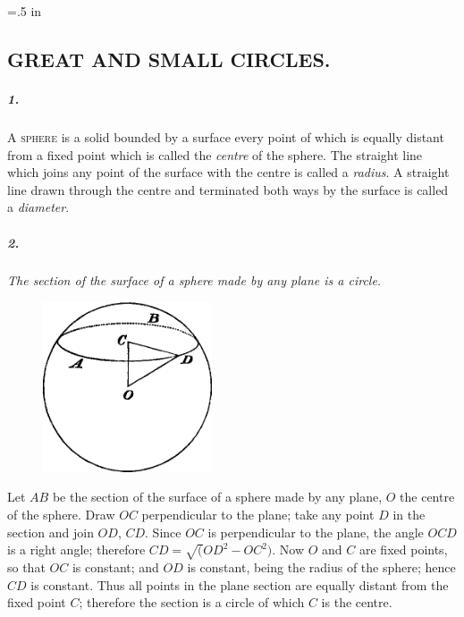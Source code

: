 \documentclass{book}[2004/02/16]
\begin{document}
\begin{mainmatter}
\headsep =.5 in
\begin{spacing}{1.3}

\chapter[Great and Small Circles.]{GREAT AND SMALL CIRCLES.}

\paragraph{1.} \textsc{A sphere} is a solid bounded by a surface every point of
which is equally distant from a fixed point which is called the
\textit{centre} of the sphere. The straight line which joins any point of
the surface with the centre is called a \textit{radius}. A straight line
drawn through the centre and terminated both ways by the surface
is called a \textit{diameter}.

\paragraph{2.} \textit{The section of the surface of a sphere made by any plane
is a circle.}
\begin{figure}[htp]
\centering
\includegraphics[width=5cm]{images/011fc}
\end{figure}

Let $AB$ be the section of the surface of a sphere made by any
plane, $O$ the centre of the sphere. Draw $OC$ perpendicular to the
plane; take any point $D$ in the section and join $OD$, $CD$. Since
$OC$ is perpendicular to the plane, the angle $OCD$ is a right angle;
therefore $CD=\surd(OD^2-OC^2)$. Now $O$ and $C$ are fixed points, so
that $OC$ is constant; and $OD$ is constant, being the radius of the
sphere; hence $CD$ is constant. Thus all points in the plane section
are equally distant from the fixed point $C$; therefore the section
is a circle of which $C$ is the centre.


\end{spacing}
\end{mainmatter}
\end{document}

